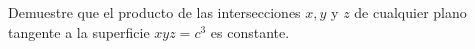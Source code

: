 \item Demuestre que el producto de las intersecciones $x, y$ y $z$ de cualquier plano tangente a la superficie $xyz = c^3$ es constante.

